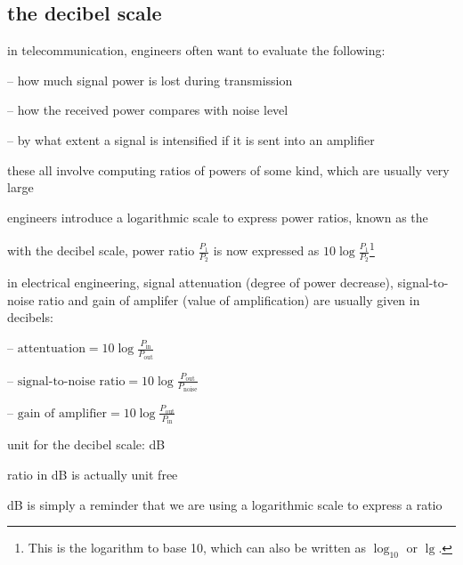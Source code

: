 \subsection{the decibel scale}

in telecommunication, engineers often want to evaluate the following:

\begin{compactitem}
	\item [--] how much signal power is lost during transmission
	
	\item [--] how the received power compares with noise level
	
	\item [--] by what extent a signal is intensified if it is sent into an amplifier
\end{compactitem}

these all involve computing ratios of powers of some kind, which are usually very large

\vspace*{\baselineskip}

engineers introduce a logarithmic scale to express power ratios, known as the 

with the decibel scale, power ratio $\frac{P_1}{P_2}$ is now expressed as $\boxed{10\log\frac{P_1}{P_2}}$\footnote{This is the logarithm to base 10, which can also be written as $\log_{10}$ or $\lg$.}

in electrical engineering, signal attenuation (degree of power decrease), signal-to-noise ratio and gain of amplifer (value of amplification) are usually given in decibels:

\begin{compactitem}
	\item[--] $ \boxed{\text{attentuation} = 10\log\frac{P_\text{in}}{P_\text{out}}}$
	
	\item[--] $ \boxed{\text{signal-to-noise ratio} = 10\log\frac{P_\text{out}}{P_\text{noise}}}$
	
	\item[--] $ \boxed{\text{gain of amplifier} = 10\log\frac{P_\text{out}}{P_\text{in}}}$
\end{compactitem}

\cmt unit for the decibel scale: dB

ratio in dB is actually unit free

dB is simply a reminder that we are using a logarithmic scale to express a ratio

